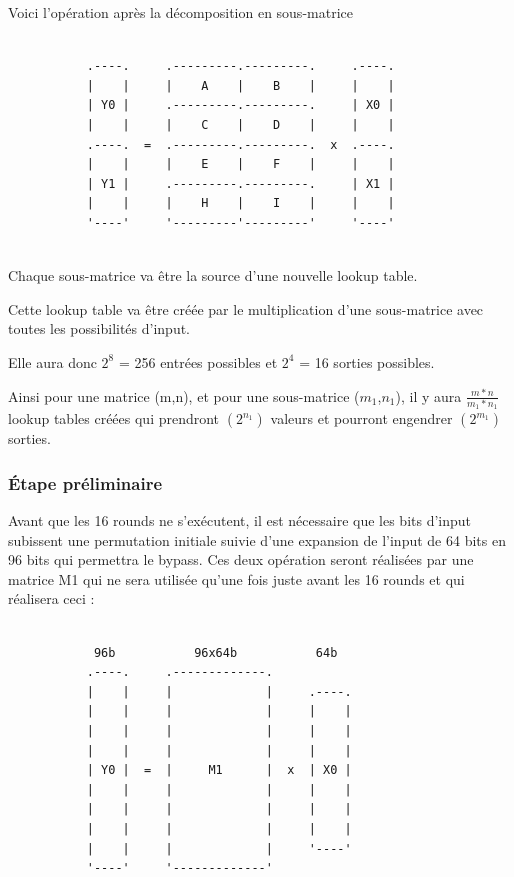 \documentclass[a4paper,12pt]{article}
\begin{document}
Voici l'opération après la décomposition en sous-matrice

\begin{Verbatim}[samepage=true]

           .----.     .---------.---------.     .----.
           |    |     |    A    |    B    |     |    |
           | Y0 |     .---------.---------.     | X0 |
           |    |     |    C    |    D    |     |    |
           .----.  =  .---------.---------.  x  .----.
           |    |     |    E    |    F    |     |    |
           | Y1 |     .---------.---------.     | X1 |
           |    |     |    H    |    I    |     |    |
           '----'     '---------'---------'     '----'
           
\end{Verbatim}

Chaque sous-matrice va être la source d'une nouvelle lookup table.

Cette lookup table va être créée par le multiplication d'une sous-matrice avec toutes les possibilités d'input.

Elle aura donc $2^8$ = 256 entrées possibles et $2^4$ = 16 sorties possibles.

Ainsi pour une matrice (m,n), et pour une sous-matrice ($m_{1}$,$n_{1}$), il y aura     $\frac{m*n}{m_{1}*n_{1}}$ lookup tables créées qui prendront $(2^{n_{1}})$ valeurs et pourront engendrer $(2^{m_{1}})$ sorties.


\subsubsection{Étape préliminaire}

Avant que les 16 rounds ne s'exécutent, il est nécessaire que les bits d'input subissent une permutation initiale suivie d'une expansion de l'input de 64 bits en 96 bits qui permettra le bypass.
Ces deux opération seront réalisées par une matrice M1 qui ne sera utilisée qu'une fois juste avant les 16 rounds et qui réalisera ceci :

\begin{Verbatim}[samepage=true]

            96b           96x64b           64b
           .----.     .-------------. 
           |    |     |             |     .----.
           |    |     |             |     |    |
           |    |     |             |     |    |
           |    |     |             |     |    |
           | Y0 |  =  |     M1      |  x  | X0 |
           |    |     |             |     |    |
           |    |     |             |     |    |
           |    |     |             |     |    |
           |    |     |             |     '----'
           '----'     '-------------'

\end{Verbatim}
\end{document}
